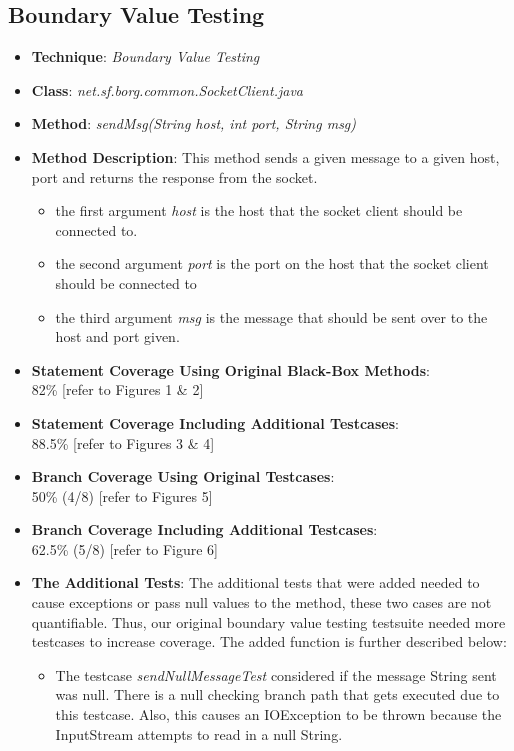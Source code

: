 \documentclass[fontsize=12pt,paper=letter,twoside]{scrartcl}
\begin{document}
\newpage
\subsection{Boundary Value Testing}
\begin{itemize}
\item \textbf{Technique}: \emph{Boundary Value Testing}
\item \textbf{Class}: \emph{net.sf.borg.common.SocketClient.java}
\item \textbf{Method}: \emph{sendMsg(String host, int port, String msg)}
\item \textbf{Method Description}: This method sends a given message to a given host, port and returns the response from the socket.
\begin{itemize}
\item the first argument \emph{host} is the host that the socket client should be connected to.
\item the second argument \emph{port} is the port on the host that the socket client should be connected to
\item the third argument \emph{msg} is the message that should be sent over to the host and port given.
\end{itemize}

\item \textbf{Statement Coverage Using Original Black-Box Methods}: \\ 82\%  [refer to Figures 1 \& 2]
\item \textbf{Statement Coverage Including Additional Testcases}: \\ 88.5\% [refer to Figures 3 \& 4]

\item \textbf{Branch Coverage Using Original Testcases}: \\ 50\% (4/8) [refer to Figures 5]
\item \textbf{Branch Coverage Including Additional Testcases}: \\ 62.5\% (5/8) [refer to Figure 6]

\item \textbf{The Additional Tests}: The additional tests that were added needed to cause exceptions or pass null values to the method, these two cases are not quantifiable. Thus, our original boundary value testing testsuite needed more testcases to increase coverage. The added function is further described below:
\begin{itemize}
\item The testcase \emph{sendNullMessageTest} considered if the message String sent was null. There is a null checking branch path that gets executed due to this testcase. Also, this causes an IOException to be thrown because the InputStream attempts to read in a null String.


\end{itemize}
\end{itemize}
\end{document}
